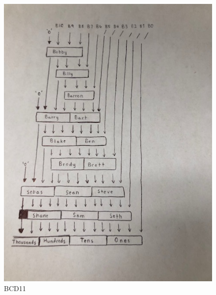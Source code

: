 \documentclass[11pt]{article}
\begin{document}
\begin{figure}[ht]\centering
	
	
	
	\includegraphics[width=1\textwidth,angle=270,origin=c,scale=1]{bcd11.jpg}
	\caption{BCD11}
	\label{fig:sim_with_table}
	
\end{figure}
	
	
\end{document}
